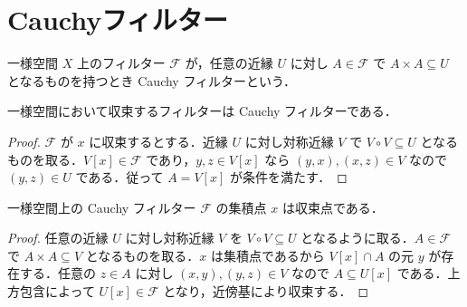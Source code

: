 \section{Cauchyフィルター}
\begin{defn}[Cauchyフィルター]
一様空間 $X$ 上のフィルター $\mathcal F$ が，任意の近縁 $U$ に対し $A\in\mathcal F$ で $A\times A\subseteq U$ となるものを持つとき Cauchy フィルターという．
\end{defn}
\begin{prop}[収束フィルターのCauchy性]
一様空間において収束するフィルターは Cauchy フィルターである．
\end{prop}
\begin{proof}
$\mathcal F$ が $x$ に収束するとする．近縁 $U$ に対し対称近縁 $V$ で $V\circ V\subseteq U$ となるものを取る．$V[x]\in\mathcal F$ であり，$y,z\in V[x]$ なら $(y,x),(x,z)\in V$ なので $(y,z)\in U$ である．従って $A=V[x]$ が条件を満たす．
\end{proof}
\begin{prop}[Cauchyフィルターの集積点]
一様空間上の Cauchy フィルター $\mathcal F$ の集積点 $x$ は収束点である．
\end{prop}
\begin{proof}
任意の近縁 $U$ に対し対称近縁 $V$ を $V\circ V\subseteq U$ となるように取る．$A\in\mathcal F$ で $A\times A\subseteq V$ となるものを取る．$x$ は集積点であるから $V[x]\cap A$ の元 $y$ が存在する．任意の $z\in A$ に対し $(x,y),(y,z)\in V$ なので $A\subseteq U[x]$ である．上方包含によって $U[x]\in\mathcal F$ となり，近傍基により収束する．
\end{proof}
